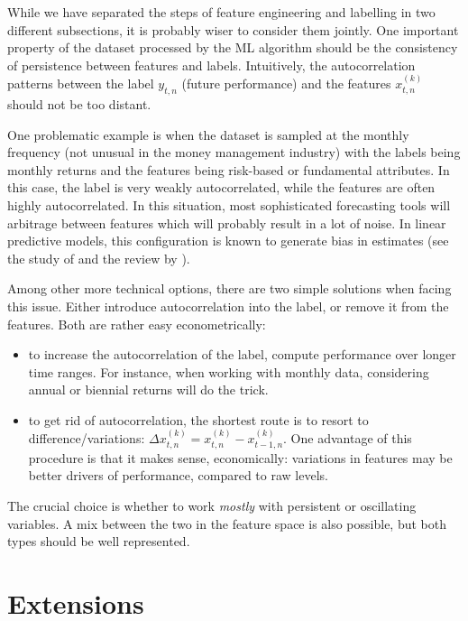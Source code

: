 \documentclass[]{krantz}
\providecommand{\tightlist}{%
  \setlength{\itemsep}{0pt}\setlength{\parskip}{0pt}}
\theoremstyle{definition}
\theoremstyle{definition}
\theoremstyle{definition}
\theoremstyle{remark}
\begin{document}
While we have separated the steps of feature engineering and labelling
in two different subsections, it is probably wiser to consider them
jointly. One important property of the dataset processed by the ML
algorithm should be the consistency of persistence between features and
labels. Intuitively, the autocorrelation patterns between the label
\(y_{t,n}\) (future performance) and the features \(x_{t,n}^{(k)}\)
should not be too distant.

One problematic example is when the dataset is sampled at the monthly
frequency (not unusual in the money management industry) with the labels
being monthly returns and the features being risk-based or fundamental
attributes. In this case, the label is very weakly autocorrelated, while
the features are often highly autocorrelated. In this situation, most
sophisticated forecasting tools will arbitrage between features which
will probably result in a lot of noise. In linear predictive models,
this configuration is known to generate bias in estimates (see the study
of \citet{stambaugh1999predictive} and the review by
\citet{gonzalo2018predictive}).

Among other more technical options, there are two simple solutions when
facing this issue. Either introduce autocorrelation into the label, or
remove it from the features. Both are rather easy econometrically:

\begin{itemize}
\tightlist
\item
  to increase the autocorrelation of the label, compute performance over
  longer time ranges. For instance, when working with monthly data,
  considering annual or biennial returns will do the trick.\\
\item
  to get rid of autocorrelation, the shortest route is to resort to
  difference/variations:
  \(\Delta x_{t,n}^{(k)}=x_{t,n}^{(k)}-x_{t-1,n}^{(k)}\). One advantage
  of this procedure is that it makes sense, economically: variations in
  features may be better drivers of performance, compared to raw levels.
\end{itemize}

The crucial choice is whether to work \emph{mostly} with persistent or
oscillating variables. A mix between the two in the feature space is
also possible, but both types should be well represented.

\hypertarget{extensions}{%
\section{Extensions}\label{extensions}}
\end{document}
